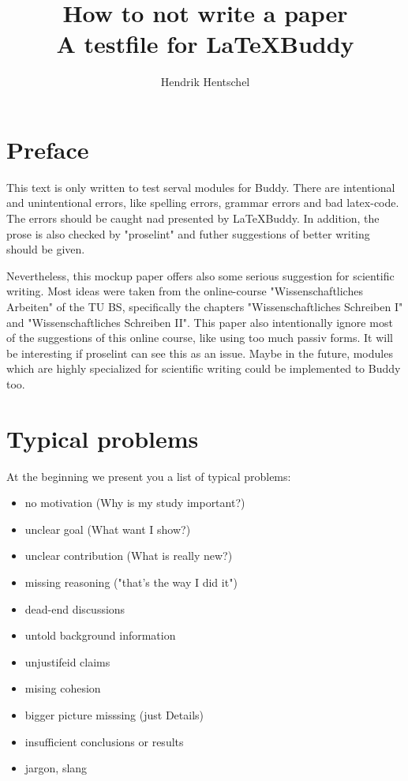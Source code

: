 \documentclass[12pt,a4paper]{article}
\begin{document}
\title{\Large \bf How to not write a paper\\ \Large A testfile for \LaTeX{}Buddy}
\author{Hendrik Hentschel}
\maketitle %
\section*{Preface}
This text is only written to test serval modules for \Latex{}Buddy. There are intentional and unintentional errors, like spelling errors, grammar errors and bad latex-code. The errors should be caught nad presented by \LaTeX{}Buddy. In addition, the prose is also checked by "proselint" and futher suggestions of better writing should be given.

Nevertheless, this mockup paper offers also some serious suggestion for scientific writing. Most ideas were taken from the online-course "Wissenschaftliches Arbeiten" of the TU BS, specifically the chapters "Wissenschaftliches Schreiben I" and "Wissenschaftliches Schreiben II". This paper also intentionally ignore most of the suggestions of this online course, like using too much passiv forms. It will be interesting if proselint can see this as an issue. Maybe in the future, modules which are highly specialized for scientific writing could be implemented to \latex{}Buddy too.

\section{Typical problems}
At the beginning we present you a list of typical problems:
\begin{itemize}
    \item no motivation (Why is my study important?)
    \item unclear goal (What want I show?)
    \item unclear contribution (What is really new?)
    \item missing reasoning ("that's the way I did it")
    \item dead-end discussions
    \item untold background information
    \item unjustifeid claims
    \item mising cohesion
    \item bigger picture misssing (just Details)
    \item insufficient conclusions or results
    \item jargon, slang
\end{itemize}
\end{document}
